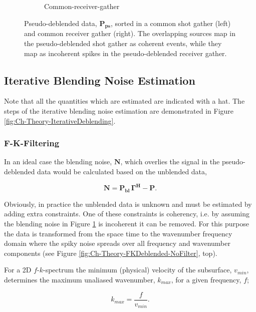 \begin{figure}
\begin{subfigure}[t]{0.25\textwidth}
		\caption{Common-receiver-gather}
		\label{fig:Ch-Theory-PseudoDeblendedCRG}
	\end{subfigure}
	\caption{Pseudo-deblended data, $\mathbf{P_{ps}}$, sorted in a common shot gather (left) and common receiver gather (right). The overlapping sources map in the pseudo-deblended shot gather as coherent events, while they map as incoherent spikes in the pseudo-deblended receiver gather.}
	\label{fig:Ch-Theory-PseudoDeblended}

\end{figure}

\subsection{Iterative Blending Noise Estimation} \label{sec:IterBlenNoiseEst}

Note that all the quantities which are estimated are indicated with a hat. The steps of the iterative blending noise estimation are demonstrated in Figure \ref{fig:Ch-Theory-IterativeDeblending}.

\subsubsection*{F-K-Filtering}
In an ideal case the blending noise, $\mathbf{N}$, which overlies the signal in the pseudo-deblended data would be calculated based on the unblended data,

\begin{equation}
	\mathbf{N} = \mathbf{P_{bl}} \, \mathbf{\Gamma^H} - \mathbf{P}.
	\label{eq:Ch-Theory-Noise}
\end{equation}

Obviously, in practice the unblended data is unknown and must be estimated by adding extra constraints. One of these constraints is coherency, i.e. by assuming the blending noise in Figure \ref{fig:Ch-Theory-PseudoDeblendedCRG} is incoherent it can be removed. For this purpose the data is transformed from the space time to the wavenumber frequency domain where the spiky noise spreads over all frequency and wavenumber components (see Figure \ref{fig:Ch-Theory-FKDeblended-NoFilter}, top). 


For a 2D $f$-$k$-spectrum the minimum (physical) velocity of the subsurface, $v_{min}$, determines the maximum unaliased wavenumber, $k_{max}$,  for a given frequency, $f$;

\begin{equation}
	k_{max} = \frac{f}{v_{min}}.
	\label{eq_Ch-Theory-MaxWavenmber}
\end{equation} 

